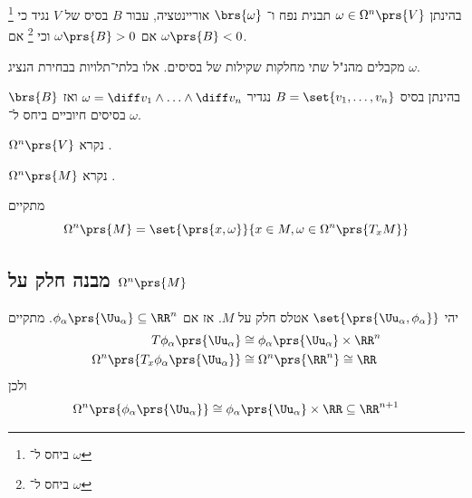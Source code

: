 \documentclass[a4paper,10pt,twoside,openany]{book}
\begin{document}
\begin{definition}
בהינתן
$\omega \in \Omega^n\prs{V}$
תבנית נפח ו־%
$\brs{\omega}$
אוריינטציה, עבור
$B$
בסיס של
$V$
נגיד כי
%
\footnote{ביחס ל־%
$\omega$}
אם
$\omega\prs{B} > 0$
וכי
%
\footnote{ביחס ל־%
$\omega$}
אם
$\omega\prs{B} < 0$.
\end{definition}

\begin{exercise}
מקבלים מהנ"ל שתי מחלקות שקילות של בסיסים. אלו בלתי־תלויות בבחירת הנציג
$\omega$.
\end{exercise}

\begin{definition}
בהינתן בסיס
$B = \set{v_1, \ldots, v_n}$
נגדיר
$\omega = \diff v_1 \wedge \ldots \wedge \diff v_n$
ואז
$\brs{B}$
בסיסים חיוביים ביחס ל־%
$\omega$.
\end{definition}

\begin{definition}
$\Omega^n\prs{V}$
נקרא
.
\end{definition}

\begin{definition}
$\Omega^n\prs{M}$
נקרא
.
\end{definition}

\begin{remark}
מתקיים
\[\Omega^n\prs{M} = \set{\prs{x,\omega}}{x\in M, \omega \in \Omega^n\prs{T_x M}}\]
\end{remark}

\subsection{מבנה חלק על
$\Omega^n \prs{M}$}
יהי
$\set{\prs{\Uu_{\alpha}, \phi_{\alpha}}}$
אטלס חלק על
$M$.
אז אם
$\phi_{\alpha}\prs{\Uu_{\alpha}} \subseteq \RR^n$.
מתקיים
\begin{align*}
T \phi_{\alpha}\prs{\Uu_{\alpha}} &\cong \phi_{\alpha}\prs{\Uu_{\alpha}} \times \RR^n \\
\Omega^n \prs{T_x \phi_{\alpha}\prs{\Uu_{\alpha}}} &\cong \Omega^n\prs{\RR^n} \cong \RR
\end{align*}
ולכן
\begin{align*}
\Omega^n \prs{\phi_{\alpha}\prs{\Uu_{\alpha}}} \cong \phi_{\alpha}\prs{\Uu_{\alpha}} \times \RR \subseteq \RR^{n+1}
\end{align*}
\end{document}
